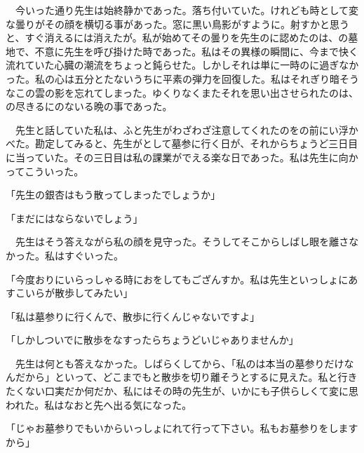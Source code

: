 \documentclass[a4j,onecolumn]{tarticle}
\begin{document}
　今いった通り先生は始終静かであった。\hbox{}落ち付いていた。\hbox{}けれども時として変な曇りがその顔を横切る事があった。\hbox{}窓に黒い鳥影がすように。\hbox{}射すかと思うと、\hbox{}すぐ消えるには消えたが。\hbox{}私が始めてその曇りを先生のに認めたのは、\hbox{}の墓地で、\hbox{}不意に先生を呼び掛けた時であった。\hbox{}私はその異様の瞬間に、\hbox{}今まで快く流れていた心臓の潮流をちょっと鈍らせた。\hbox{}しかしそれは単に一時のに過ぎなかった。\hbox{}私の心は五分とたないうちに平素の弾力を回復した。\hbox{}私はそれぎり暗そうなこの雲の影を忘れてしまった。\hbox{}ゆくりなくまたそれを思い出させられたのは、\hbox{}の尽きるにのないる晩の事であった。\hbox{}\par{}
　先生と話していた私は、\hbox{}ふと先生がわざわざ注意してくれたのをの前にい浮かべた。\hbox{}勘定してみると、\hbox{}先生がとして墓参に行く日が、\hbox{}それからちょうど三日目に当っていた。\hbox{}その三日目は私の課業がでえる楽な日であった。\hbox{}私は先生に向かってこういった。\hbox{}\par{}
「先生の銀杏はもう散ってしまったでしょうか」\par{}
「まだにはならないでしょう」\par{}
　先生はそう答えながら私の顔を見守った。\hbox{}そうしてそこからしばし眼を離さなかった。\hbox{}私はすぐいった。\hbox{}\par{}
「今度おりにいらっしゃる時におをしてもござんすか。\hbox{}私は先生といっしょにあすこいらが散歩してみたい」\par{}
「私は墓参りに行くんで、\hbox{}散歩に行くんじゃないですよ」\par{}
「しかしついでに散歩をなすったらちょうどいじゃありませんか」\par{}
　先生は何とも答えなかった。\hbox{}しばらくしてから、\hbox{}「私のは本当の墓参りだけなんだから」といって、\hbox{}どこまでもと散歩を切り離そうとするに見えた。\hbox{}私と行きたくない口実だか何だか、\hbox{}私にはその時の先生が、\hbox{}いかにも子供らしくて変に思われた。\hbox{}私はなおと先へ出る気になった。\hbox{}\par{}
「じゃお墓参りでもいからいっしょにれて行って下さい。\hbox{}私もお墓参りをしますから」\par{}
\end{document}
